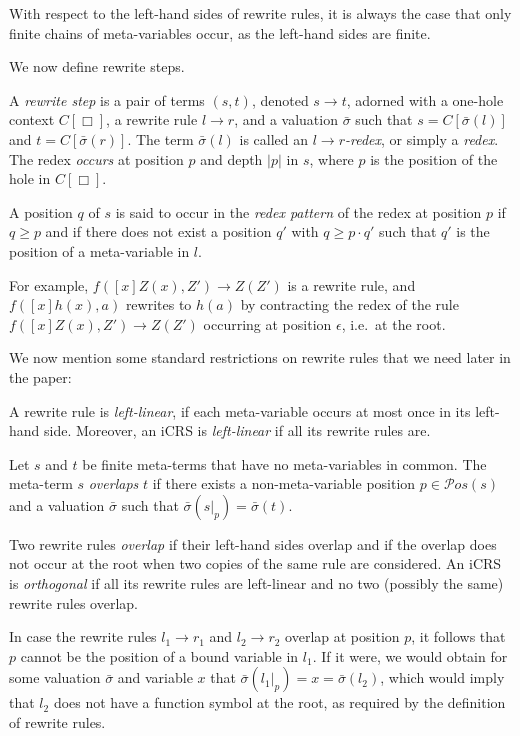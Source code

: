 \documentclass{LMCS}
\theoremstyle{plain}
\theoremstyle{definition}
\newcommand{\rew}{\rightarrow}
\newcommand{\pos}[1]{\mathcal{P}os(#1)}
\begin{document}
With respect to the left-hand sides of rewrite rules, it is always the case that only finite chains of meta-variables occur, as the left-hand sides are finite.

We now define rewrite steps.
\begin{defi}
A \emph{rewrite step} is a pair of terms $(s, t)$, denoted $s \rew t$, adorned with a one-hole context $C[\Box]$, a rewrite rule $l \rew r$, and a valuation $\bar{\sigma}$ such that $s = C[\bar{\sigma}(l)]$ and $t = C[\bar{\sigma}(r)]$.
The term
$\bar{\sigma}(l)$ is called an \emph{$l \rew r$-redex}, or
simply a \emph{redex}. The redex \emph{occurs} at position $p$ and
depth $|p|$ in $s$, where $p$ is the position of the hole in $C[\Box]$.

A position $q$ of $s$ is said to occur in the \emph{redex pattern} of
the redex at position $p$ if $q \geq p$ and if there does
not exist a position $q'$ with $q \geq p \cdot q'$ such that $q'$ is the
position of a meta-variable in $l$.
\end{defi}

For example, $f([x]Z(x),Z') \rightarrow Z(Z')$ is a rewrite rule,
and $f([x]h(x),a)$ rewrites to $h(a)$ by contracting the redex of the rule 
$f([x]Z(x),Z') \rightarrow Z(Z')$ occurring at position $\epsilon$, i.e.\ at the root.

We now mention some standard restrictions on rewrite rules 
that we need later in the paper: 

\begin{defi}
A rewrite rule is \emph{left-linear}, if each meta-variable occurs at
most once in its left-hand side. Moreover, an iCRS is \emph{left-linear}
if all its rewrite rules are.
\end{defi}

\begin{defi}
Let $s$ and $t$ be finite meta-terms that have no meta-variables in common. The meta-term $s$ \emph{overlaps} $t$ if there exists a non-meta-variable position $p \in \pos{s}$ and a valuation $\bar{\sigma}$ such that $\bar{\sigma}(s|_p) = \bar{\sigma}(t)$.

Two rewrite rules \emph{overlap} if their left-hand sides overlap and if the overlap does not occur at the root when two copies of the same rule are considered. An iCRS is \emph{orthogonal} if all its rewrite rules are left-linear and no two (possibly the same) rewrite rules overlap.
\end{defi}

In case the rewrite rules $l_1 \rew r_1$ and $l_2 \rew r_2$ overlap
at position $p$, it follows that $p$ cannot be the position of a
bound variable in $l_1$. If it were, we would obtain for some valuation
$\bar{\sigma}$ and variable $x$ that $\bar{\sigma}(l_1|_p) = x = 
\bar{\sigma}(l_2)$, which would imply that $l_2$ does not have
a function symbol at the root, as required by the definition of
rewrite rules.
\end{document}
